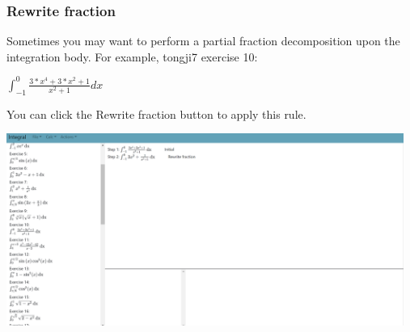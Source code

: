 \documentclass[titlepage]{article}
\begin{document}
\subsubsection{Rewrite fraction}
Sometimes you may want to perform a partial fraction decomposition upon the integration body. For example, tongji7 exercise 10:
\begin{center}
$\int_{-1}^{0} \frac{3*x^4 + 3*x^2 + 1}{x^2 + 1} dx$
\end{center}
You can click the \colorbox{mygray}{Rewrite fraction} button to apply this rule.\\
\includegraphics[width=13cm, height=7cm]{16.png}
\end{document}
